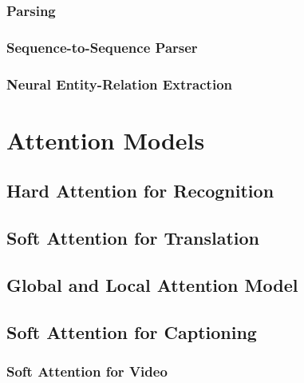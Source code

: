 			\subsubsection{Parsing} %

			\subsubsection{Sequence-to-Sequence Parser} %

			\subsubsection{Neural Entity-Relation Extraction} %

	\section{Attention Models} %

		\subsection{Hard Attention for Recognition} %

		\subsection{Soft Attention for Translation} %

		\subsection{Global and Local Attention Model} %

		\subsection{Soft Attention for Captioning} %

			\subsubsection{Soft Attention for Video} %

